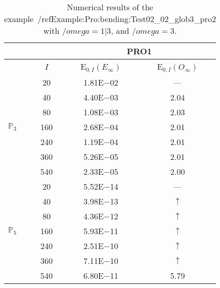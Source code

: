 \begin{table}[H]
\caption{Numerical results of the example~/ref{Example:Pro:bending:Test02_02_glob3_pro2} with $/omega=1|3$, and $/omega=3$.}
\setlength{\tabcolsep}{5pt}
\centering
\begin{tabular}{@{}l c c c@{}}
\toprule
 &  & \multicolumn{2}{c}{PRO1}\\
\midrule
 & $I$ & E$_{0,I}(E_{\infty})$ & E$_{0,I}(O_{\infty})$\\
\midrule
\multirow{7}{*}{$\mathbb{P}_{3}$}
 & 20 & 1.81E$-$02 & ---\\
 & 40 & 4.40E$-$03 & 2.04\\
 & 80 & 1.08E$-$03 & 2.03\\
 & 160 & 2.68E$-$04 & 2.01\\
 & 240 & 1.19E$-$04 & 2.01\\
 & 360 & 5.26E$-$05 & 2.01\\
 & 540 & 2.33E$-$05 & 2.00\\
\midrule
\multirow{7}{*}{$\mathbb{P}_{5}$}
 & 20 & 5.52E$-$14 & ---\\
 & 40 & 3.98E$-$13 & $\uparrow$\\
 & 80 & 4.36E$-$12 & $\uparrow$\\
 & 160 & 5.93E$-$11 & $\uparrow$\\
 & 240 & 2.51E$-$10 & $\uparrow$\\
 & 360 & 7.11E$-$10 & $\uparrow$\\
 & 540 & 6.80E$-$11 & 5.79\\
\bottomrule
\end{tabular}
\label{Table:PRO:test_02_02_test11_pro2}
\end{table}
